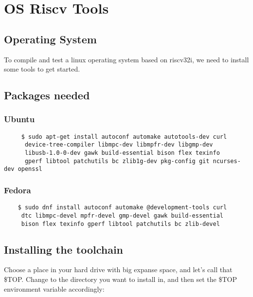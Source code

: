 
\chapter{OS Riscv Tools}

\section{Operating System}

To compile and test a linux operating system based on riscv32i, we need to install some tools to get started. 

\section{Packages needed}

\subsection{Ubuntu}
\begin{verbatim}
     $ sudo apt-get install autoconf automake autotools-dev curl 
      device-tree-compiler libmpc-dev libmpfr-dev libgmp-dev 
      libusb-1.0-0-dev gawk build-essential bison flex texinfo 
      gperf libtool patchutils bc zlib1g-dev pkg-config git ncurses-dev openssl

\end{verbatim}

\subsection{Fedora}

\begin{verbatim}
    $ sudo dnf install autoconf automake @development-tools curl
     dtc libmpc-devel mpfr-devel gmp-devel gawk build-essential 
     bison flex texinfo gperf libtool patchutils bc zlib-devel
\end{verbatim}

\section{Installing the toolchain}

Choose a place in your hard drive with big expanse space, and let's call that \$TOP.
Change to the directory you want to install in, and then set the \$TOP environment variable accordingly:

